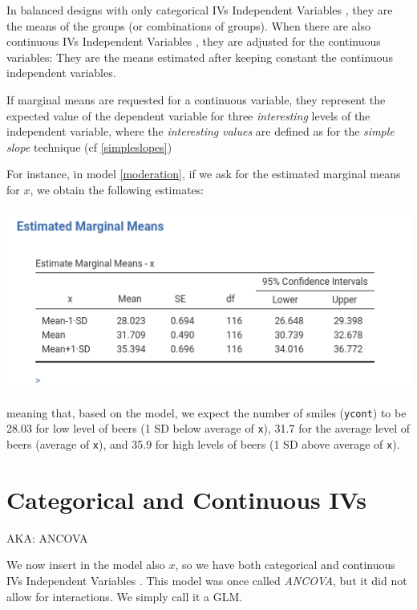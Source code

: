 \documentclass[
]{book}
\begin{document}
In balanced designs with only categorical {IVs {Independent Variables} }, they are the means of the groups (or combinations of groups). When there are also continuous {IVs {Independent Variables} }, they are adjusted for the continuous variables: They are the means estimated after keeping constant the continuous independent variables.

If marginal means are requested for a continuous variable, they represent the expected value of the dependent variable for three \emph{interesting} levels of the independent variable, where the \emph{interesting values} are defined as for the \emph{simple slope} technique (cf \ref{simpleslopes})

For instance, in model \ref{moderation}, if we ask for the estimated marginal means for \(x\), we obtain the following estimates:

\includegraphics{bookletpics/2_moderation_output1.png}

meaning that, based on the model, we expect the number of smiles (\texttt{ycont}) to be 28.03 for low level of beers (1 SD below average of \texttt{x}), 31.7 for the average level of beers (average of \texttt{x}), and 35.9 for high levels of beers (1 SD above average of \texttt{x}).

\hypertarget{ancova}{%
\section{Categorical and Continuous IVs}\label{ancova}}

\begin{flushright} AKA: ANCOVA  \end{flushright}

We now insert in the model also \(x\), so we have both categorical and continuous {IVs {Independent Variables} }. This model was once called \emph{ANCOVA}, but it did not allow for interactions. We simply call it a GLM.
\end{document}
